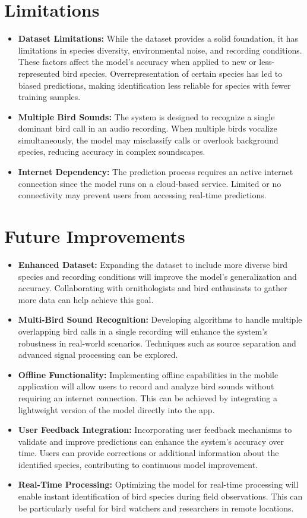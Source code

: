 \section{Limitations}
\begin{itemize}
      \item \textbf{Dataset Limitations:} While the dataset provides a solid foundation, it has limitations in species diversity, environmental noise, and recording conditions. These factors affect the model's accuracy when applied to new or less-represented bird species. Overrepresentation of certain species has led to biased predictions, making identification less reliable for species with fewer training samples.
      \item \textbf{Multiple Bird Sounds:} The system is designed to recognize a single dominant bird call in an audio recording. When multiple birds vocalize simultaneously, the model may misclassify calls or overlook background species, reducing accuracy in complex soundscapes.
      \item \textbf{Internet Dependency:} The prediction process requires an active internet connection since the model runs on a cloud-based service. Limited or no connectivity may prevent users from accessing real-time predictions.
\end{itemize}

\section{Future Improvements}
\begin{itemize}
      \item \textbf{Enhanced Dataset:} Expanding the dataset to include more diverse bird species and recording conditions will improve the model's generalization and accuracy. Collaborating with ornithologists and bird enthusiasts to gather more data can help achieve this goal.
      \item \textbf{Multi-Bird Sound Recognition:} Developing algorithms to handle multiple overlapping bird calls in a single recording will enhance the system's robustness in real-world scenarios. Techniques such as source separation and advanced signal processing can be explored.
      \item \textbf{Offline Functionality:} Implementing offline capabilities in the mobile application will allow users to record and analyze bird sounds without requiring an internet connection. This can be achieved by integrating a lightweight version of the model directly into the app.
      \item \textbf{User Feedback Integration:} Incorporating user feedback mechanisms to validate and improve predictions can enhance the system's accuracy over time. Users can provide corrections or additional information about the identified species, contributing to continuous model improvement.
      \item \textbf{Real-Time Processing:} Optimizing the model for real-time processing will enable instant identification of bird species during field observations. This can be particularly useful for bird watchers and researchers in remote locations.
\end{itemize}

